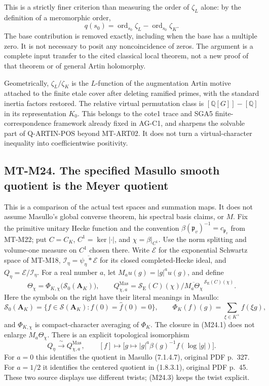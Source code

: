 This is a strictly finer criterion than measuring the order
of $\zeta_L$ alone: by the definition of a meromorphic order,
\[
 q(s_0)=\operatorname{ord}_{s_0}\zeta_L
                 -\operatorname{ord}_{s_0}\zeta_K.
\]
The base contribution is removed exactly, including when the
base has a multiple zero. It is not necessary to posit any
noncoincidence of zeros. The argument is a complete input
transfer to the cited classical local theorem, not a new proof
of that theorem or of general Artin holomorphy.

Geometrically, $\zeta_L/\zeta_K$ is the $L$-function of the
augmentation Artin motive attached to the finite etale cover
after deleting ramified primes, with the standard inertia
factors restored. The relative virtual permutation class is
$[\mathbb Q[G]]-[\mathbb Q]$ in its representation $K_0$.
This belongs to the cote1 trace and SGA5 finite-correspondence
framework already fixed in AG-C1, and sharpens the
solvable part of Q-ARTIN-POS beyond MT-ART02. It does not turn a
virtual-character inequality into coefficientwise positivity.


\subsection*{MT-M24. The specified Masullo smooth quotient is the Meyer quotient}
This is a comparison of the actual test spaces and summation maps. It does
not assume Masullo's global converse theorem, his spectral basis claims,
or $M$. Fix the primitive unitary Hecke function and the convention
$\beta(\mathfrak p_v)^{-1}=c_{\mathfrak p_v}$ from MT-M22; put
$C=C_K$, $C^1=\ker|\cdot|$, and $\chi=\beta|_{C^1}$.
Use the norm splitting and volume-one measure on $C^1$ chosen there.
Write $\mathcal E$ for the exponential Schwartz space of MT-M18,
$\mathcal I_\eta=\overline{\psi_\eta*\mathcal E}$ for its closed
completed-Hecke ideal, and $Q_\eta=\mathcal E/\mathcal I_\eta$.
For a real number $a$, let $M_a u(g)=|g|^a u(g)$, and define
\[
 \Theta_\chi=\Phi_{K,\chi}\bigl(\mathcal S_0(\mathbf A_K)\bigr),
 \qquad
 Q^{\mathrm{Mas}}_{\chi,a}
 =\mathcal S_{\mathrm E}(C)(\chi)\big/
       \overline{M_a\Theta_\chi}^{\,\mathcal S_{\mathrm E}(C)(\chi)}.
 \tag{M24.1}
\]
Here the symbols on the right have their literal meanings in Masullo:
\[
 \mathcal S_0(\mathbf A_K)
  =\{f\in\mathcal S(\mathbf A_K):f(0)=\widehat f(0)=0\},
 \qquad
 \Phi_K(f)(g)=\sum_{\xi\in K^\times}f(\xi g),
 \tag{M24.2}
\]
and $\Phi_{K,\chi}$ is compact-character averaging of $\Phi_K$.
The closure in (M24.1) does not enlarge $M_a\Theta_\chi$.
There is an explicit topological isomorphism
\[
 Q_\eta\xrightarrow{\ \sim\ }Q^{\mathrm{Mas}}_{\chi,a},
 \qquad
 [f]\longmapsto
 \bigl[g\longmapsto |g|^a\beta(g)^{-1}f(\log|g|)\bigr].
 \tag{M24.3}
\]
For $a=0$ this identifies the quotient in Masullo (7.1.4.7),
original PDF p.~327. For $a=1/2$ it identifies the centered quotient
in (1.8.3.1), original PDF p.~45. These two source displays use
different twists; (M24.3) keeps the twist explicit.

